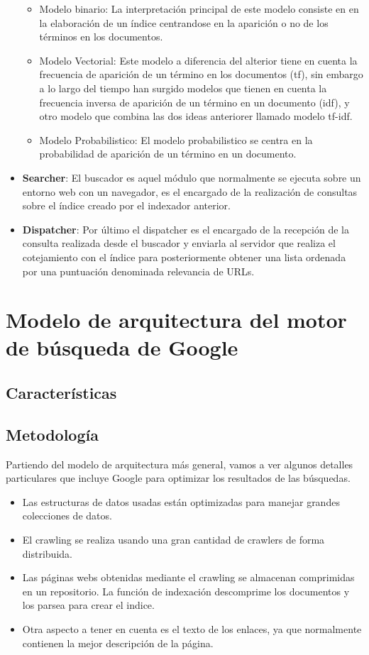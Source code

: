 \documentclass[a4paper, 11pt]{article} %
\begin{document}
\begin{itemize}
				\begin{itemize}
					\item Modelo binario: La interpretación principal de este modelo consiste en en la elaboración de un índice centrandose en la aparición o no de los términos en los documentos.
					\item Modelo Vectorial: Este modelo a diferencia del alterior tiene en cuenta la frecuencia de aparición de un término en los documentos (tf), sin embargo a lo largo del tiempo han surgido modelos que tienen en cuenta la frecuencia inversa de aparición de un término en un documento (idf), y otro modelo que combina las dos ideas anteriorer llamado modelo tf-idf.
					\item Modelo Probabilistico: El modelo probabilistico se centra en la probabilidad de aparición de un término en un documento.
				\end{itemize}
			\item \textbf{Searcher}: El buscador es aquel módulo que normalmente se ejecuta sobre un entorno web con un navegador, es el encargado de la realización de consultas sobre el índice creado por el indexador anterior.
			\item \textbf{Dispatcher}: Por último el dispatcher es el encargado de la recepción de la consulta realizada desde el buscador y enviarla al servidor que realiza el cotejamiento con el índice para posteriormente obtener una lista ordenada por una puntuación denominada relevancia de URLs.
		\end{itemize}
	\section{Modelo de arquitectura del motor de búsqueda de Google}
		\subsection{Características}
		\subsection{Metodología}
		Partiendo del modelo de arquitectura más general, vamos a ver algunos detalles particulares que incluye Google para optimizar los resultados de las búsquedas.
		\begin{itemize}
			\item Las estructuras de datos usadas están optimizadas para manejar grandes colecciones de datos.
			\item El crawling se realiza usando una gran cantidad de crawlers de forma distribuida.
			\item Las páginas webs obtenidas mediante el crawling se almacenan comprimidas en un repositorio. La función de indexación descomprime los documentos y los parsea para crear el indice.
			\item Otra aspecto a tener en cuenta es el texto de los enlaces, ya que normalmente contienen la mejor descripción de la página.
		\end{itemize}
		
\end{document}
